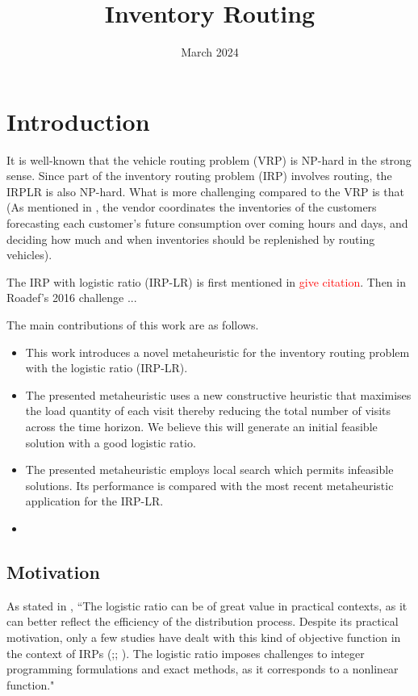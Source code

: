 \documentclass{article}
\title{Inventory Routing}
\date{March 2024}
\begin{document}
\maketitle

\section{Introduction}

It is well-known that the vehicle routing problem (VRP) is NP-hard in the strong sense.
Since part of the inventory routing problem (IRP) involves routing, the IRPLR is also NP-hard. What is more challenging compared to the VRP is that (As mentioned in \cite{kheiri2020heuristic}, the vendor coordinates the inventories of the customers forecasting each customer's future consumption over coming hours and days, and deciding how much and when inventories should be replenished by routing vehicles). 

The IRP with logistic ratio (IRP-LR) is first mentioned in \textcolor{red}{give citation}. Then in Roadef's 2016 challenge ...

The main contributions of this work are as follows.

\begin{itemize}
    \item This work introduces a novel metaheuristic for the inventory routing problem with the logistic ratio (IRP-LR).
    \item The presented metaheuristic uses a new constructive heuristic that maximises the load quantity of each visit thereby reducing the total number of visits across the time horizon. We believe this will generate an initial feasible solution with a good logistic ratio.
    \item The presented metaheuristic employs local search which permits infeasible solutions. Its performance is compared with the most recent metaheuristic application for the IRP-LR.
    \item 
\end{itemize}


\subsection{Motivation}
As stated in \cite{alvarez2018iterated}, ``The logistic ratio can be of great value in practical contexts, as it can better reflect the efficiency of the distribution process. Despite its practical motivation, only a few studies have dealt with this kind of objective function in the context of IRPs (\cite{benoist2011randomized};\cite{singh2015incremental}; \cite{archetti2017minimizing}). The logistic ratio imposes challenges to integer programming formulations and exact methods, as it corresponds to a nonlinear function."
\end{document}
